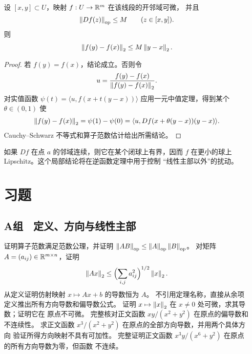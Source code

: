 \begin{theorem}[向量值平均估计]
\label{thm:vector-mean-value-inequality}
设 \([x,y]\subset U\)，映射 \(f:U\to\mathbb{R}^m\) 在该线段的开邻域可微，
并且
\[
 \left\lVert Df(z)\right\rVert_{\mathrm{op}}\le M\qquad(z\in[x,y]).
\]
则
\[
 \left\lVert f(y)-f(x)\right\rVert_2\le M\left\lVert y-x\right\rVert_2.
\]
\end{theorem}

\begin{proof}
若 \(f(y)=f(x)\)，结论成立。否则令
\[
 u=\frac{f(y)-f(x)}{\left\lVert f(y)-f(x)\right\rVert_2}.
\]
对实值函数
\(\psi(t)=\langle u,f(x+t(y-x))\rangle\) 应用一元中值定理，得到某个
\(\theta\in(0,1)\) 使
\[
 \left\lVert f(y)-f(x)\right\rVert_2
 =\psi(1)-\psi(0)
 =\langle u,Df(x+\theta(y-x))(y-x)\rangle.
\]
Cauchy--Schwarz 不等式和算子范数估计给出所需结论。
\end{proof}

如果 \(Df\) 在点 \(a\) 的邻域连续，则它在某个闭球上有界，因而 \(f\)
在更小的球上 Lipschitz。这个局部结论将在逆函数定理中用于控制
“线性主部以外”的扰动。

\section*{习题}

\subsection*{A组　定义、方向与线性主部}
\begin{enumerate}[label=\textbf{\thechapter.\arabic*.}]
 证明算子范数满足范数公理，并证明
 \(\left\lVert AB\right\rVert_{\mathrm{op}}\le\left\lVert A\right\rVert_{\mathrm{op}}\left\lVert B\right\rVert_{\mathrm{op}}\)。
 对矩阵 \(A=(a_{ij})\in\mathbb{R}^{m\times n}\)，证明
 \[
  \left\lVert Ax\right\rVert_2\le
  \Bigl(\sum_{i,j}a_{ij}^2\Bigr)^{1/2}\left\lVert x\right\rVert_2.
 \]
 从定义证明仿射映射 \(x\mapsto Ax+b\) 的导数恒为 \(A\)。
 不引用定理名称，直接从余项定义推出所有方向导数和偏导数公式。
 证明 \(x\mapsto\left\lVert x\right\rVert_2\) 在 \(x\ne0\) 处可微，求其导数；证明它在
 原点不可微。
 完整核对正文函数 \(xy/(x^2+y^2)\) 在原点的偏导数和不连续性。
 求正文函数 \(x^3/(x^2+y^2)\) 在原点的全部方向导数，并用两个具体方向
 验证所得方向映射不具有可加性。
 完整证明正文函数 \(x^3y/(x^6+y^2)\) 在原点的所有方向导数为零，但函数
 不连续。
\end{enumerate}

